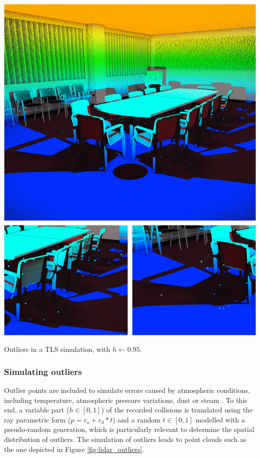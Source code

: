 \begin{marginfigure}[.3cm]
	\centering
	\includegraphics[width=\linewidth]{figs/lidar_simulation/outliers.png}
	\caption{Outliers in a TLS simulation, with $h \gets 0.95$.}
	\label{fig:lidar_outliers}
\end{marginfigure}

\subsubsection{Simulating outliers}

Outlier points are included to simulate errors caused by atmospheric conditions, including temperature, atmospheric pressure variations, dust or steam \cite{boehler_investigating_2018}. To this end, a variable part ($h \in [0, 1]$) of the recorded collisions is translated using the ray parametric form ($p = r_o + r_d * t$) and a random $t \in [0, 1]$ modelled with a pseudo-random generation, which is particularly relevant to determine the spatial distribution of outliers. The simulation of outliers leads to point clouds such as the one depicted in Figure \ref{fig:lidar_outliers}.


